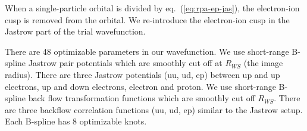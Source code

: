 When a single-particle orbital is divided by eq.~(\ref{eq:rpa-ep-jas}), the electron-ion cusp is removed from the orbital. We re-introduce the electron-ion cusp in the Jastrow part of the trial wavefunction. 

There are 48 optimizable parameters in our wavefunction. We use short-range B-spline Jastrow pair potentials which are smoothly cut off at $R_{WS}$ (the image radius). There are three Jastrow potentials (uu, ud, ep) between up and up electrons, up and down electrons, electron and proton. We use short-range B-spline back flow transformation functions which are smoothly cut off $R_{WS}$. There are three backflow correlation functions (uu, ud, ep) similar to the Jastrow setup. Each B-spline has 8 optimizable knots.
\begin{comment}
\subsection{QMC Data}

At each density, we perform one VMC and two DMC calculations. Each QMC calculation is labeled by a series index. The VMC calculation is series 0. The first DMC calculation with a relatively large time step is series 1. The second DMC calculation with a relatively small time step is series 2. We post-process the raw results (series 0 - 2) to produce series 3 and 4. We linearly extrapolate the DMC results (series 1, 2) to zero time step and label the results series 3. We linearly extrapolate the VMC and the t=0 DMC results (series 0, 3) to obtain pure-estimator kinetic and potential energies and label them series 4.

Twist-average QMC energies are displayed in the following table. The dUlr column contains the many-body finite size correction which will be described in the next section.

\begin{table}[h]
\small

\caption{Cmca-4}
\end{table}

\begin{table}[h]
\small

\caption{Cmca-12}
\end{table}

\begin{table}[h]
\small

\caption{C2/c-24}
\end{table}

\begin{table}[h]
\small

\caption{I4$_1$/amd}
\end{table}


\end{comment}
